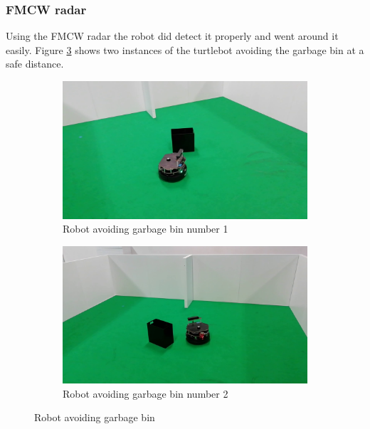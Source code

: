 \subsubsection*{FMCW radar}
Using the \ac{FMCW} radar the robot did detect it properly and went around it easily.
 Figure \ref{fig:garbageRS} shows two instances of the turtlebot avoiding the garbage bin at a safe distance.
\begin{figure}[h!]
  \centering
  \begin{subfigure}[b]{0.49\linewidth}
    \includegraphics[width=\linewidth]{imgs/chapter5/garbageRS.png}
     \caption{Robot avoiding garbage bin number 1}
     \label{fig::wchair}
  \end{subfigure}
  \begin{subfigure}[b]{0.49\linewidth}
    \includegraphics[width=\linewidth]{imgs/chapter5/garbageRS2.png}
    \caption{Robot avoiding garbage bin  number 2}
    \label{fig::nchair}
  \end{subfigure}
  \caption{Robot avoiding garbage bin}
  \label{fig:garbageRS}
\end{figure}

